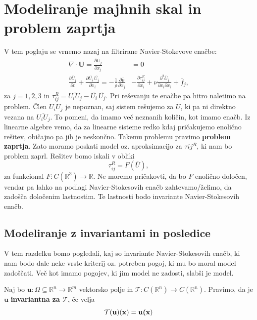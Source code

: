 \documentclass[mat2, tisk]{fmfdelo}
\newcommand{\R}{\mathbb R}
\newcommand{\bd}{\textbf}
\begin{document}
\section{Modeliranje majhnih skal in problem zaprtja}
V tem poglaju se vrnemo nazaj na filtrirane Navier-Stokevove enačbe: 
\begin{align*}
  \nabla\cdot\overline{\bd{U}} = \frac{\partial \overline{U}_j}{\partial x_j} &= 0\\[2mm]
  \frac{\partial \overline{U}_j}{\partial t} + \frac{\partial \overline{U_i}\, \overline{U_j}}{\partial x_i} = -\frac{1}{\rho} \frac{\partial \overline{p}}{\partial x_j}& 
- \frac{\partial \tau_{ij}^{R}}{\partial x_i}+ \nu \frac{\partial^2 \overline{U}_j}{\partial x_i \partial x_i} + \overline{f}_j,
\end{align*}
za $j=1, 2, 3$ in $\tau_{ij}^R = \overline{U_i U_j} - \overline{U_i} \,\overline{U_j}$. 
Pri reševanju te enačbe pa hitro naletimo na problem. Člen $\overline{U_i U_j}$ 
je nepoznan, saj sistem rešujemo za $\overline{U}$, ki pa ni direktno vezana na $\overline{U_i U_j}$. 
To pomeni, da imamo več neznanih količin, kot imamo enačb. Iz linearne algebre 
vemo, da za linearne sisteme redko kdaj pričakujemo enolično rešitev, 
običajno pa jih je neskončno. Takemu problemu pravimo \bd{problem zaprtja}.
Zato moramo poskati model oz. aproksimacijo za $\tau{ij}^R$, ki nam bo problem 
zaprl. Rešitev bomo iskali v obliki 
\begin{equation}
\tau_{ij}^R = F(\overline{U}), 
\end{equation}
za funkcional $F: C(\R^3) \rightarrow \R$. Ne moremo pričakovti, da 
bo $F$ enolično določen, vendar pa lahko na podlagi Navier-Stokesovih enačb zahtevamo/želimo,
da zadošča določenim lastnostim. Te lastnosti bodo invariante Navier-Stokesovih enačb.

\subsection{Modeliranje z invariantami in posledice}

V tem razdelku bomo pogledali, kaj so invariante Navier-Stokesovih 
enačb, ki nam bodo dale neke vrste kriterij oz. potreben pogoj, ki 
mu bo moral model zadoščati. Več kot imamo pogojev, ki jim model 
ne zadosti, slabši je model.

\begin{definicija}
Naj bo $\bd{u}: \Omega \subseteq \R^n \rightarrow \R^m$ vektorsko polje 
in $\mathcal{T}:C(\R^n) \rightarrow C(\R^n)$. Pravimo, da je $\bd{u}$
\bd{invariantna za $\mathcal{T}$}, če velja
\begin{equation}
\mathcal{T}(\bd{u})(\bd{x}) = \bd{u(\bd{x}})
\end{equation}
\end{definicija}
\end{document}

